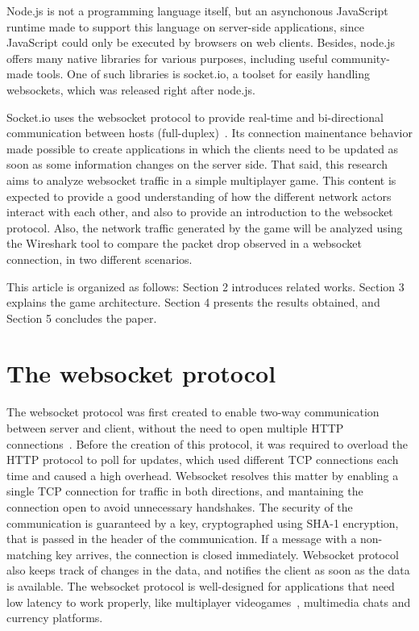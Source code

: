 \documentclass[english]{sbrt}
\begin{document}
Node.js is not a programming language itself, but an asynchonous JavaScript runtime made to support this language on server-side applications, since JavaScript could
only be executed by browsers on web clients. Besides, node.js offers many native libraries for various purposes, including useful community-made tools. One of such libraries is socket.io, a toolset for easily handling websockets, which was released right after node.js.

Socket.io uses the websocket protocol to provide real-time and bi-directional communication between hosts (full-duplex)~\cite{zhao2013real}. Its connection mainentance behavior made possible to create applications in which the clients need to be updated as soon as some information changes on the server side. That said, this research aims to analyze websocket traffic in a simple multiplayer game. This content is expected to provide a good understanding of how the different network
actors interact with each other, and also to provide an introduction to the websocket protocol. Also, the network traffic generated by the game will be analyzed
using the Wireshark tool to compare the packet drop observed in a websocket connection, in two different scenarios.

This article is organized as follows: Section 2 introduces related works. Section 3 explains the game architecture. Section 4 presents the results obtained, and Section 5 concludes the paper.

\section{\textbf{The websocket protocol}}
The websocket protocol was first created to enable two-way communication between server and client, without the need to open multiple HTTP connections~\cite{yassein2016application}. Before the creation of this protocol, it was required to overload the HTTP protocol to poll for updates, which used different TCP connections each time and caused a high overhead. Websocket resolves this matter by enabling a single TCP connection for traffic in both directions, and mantaining the connection open to avoid unnecessary handshakes. The security of the communication is guaranteed by a key, cryptographed using SHA-1 encryption, that is passed in the header of the communication. If a message with a non-matching key arrives, the connection is closed immediately. Websocket protocol also keeps track of changes in the data, and notifies the client as soon as the data is available. The websocket protocol is well-designed for applications that need low latency to work properly, like multiplayer videogames~\cite{tai2019development}, multimedia chats and currency platforms.
\end{document}
